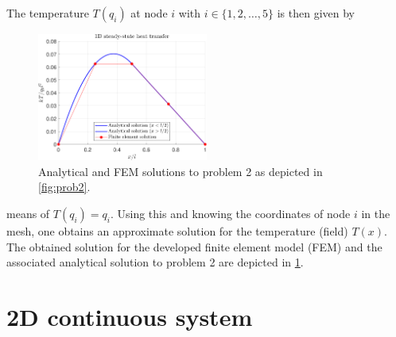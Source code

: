 \documentclass[a4paper,11pt]{article}
\numberwithin{equation}{section}
\begin{document}
{The temperature $T(q_i)$ at node $i$ with $i \in \{1,2,\dots,5\}$ is then given by 
\begin{figure}[h]
	\centering
	\includegraphics[width=0.5\textwidth]{figures/prob2_sol.pdf}
	\caption{Analytical and FEM solutions to problem 2 as depicted in \cref{fig:prob2}.}
	\label{fig:prob2_sol}
\end{figure}
means of $T(q_i) = q_i$. Using this and knowing the coordinates of node $i$ in the mesh, one obtains an approximate solution for the temperature (field) $T(x)$. The obtained solution for the developed finite element model (FEM) and the associated analytical solution to problem 2 are depicted in \cref{fig:prob2_sol}.
}

\section{2D continuous system}
\end{document}
